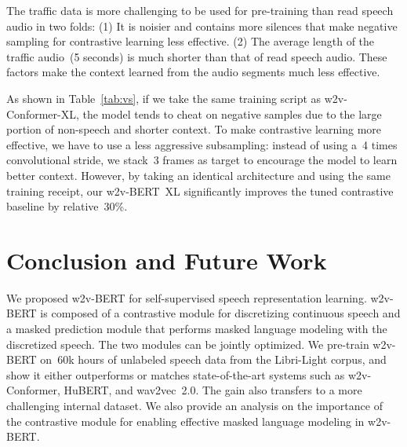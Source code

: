 \documentclass{article}
\begin{document}
The traffic data is more challenging to be used for pre-training than read speech audio in two folds: (1) It is noisier and contains more silences that make negative sampling for contrastive learning less effective.
(2) The average length of the traffic audio~(5 seconds) is much shorter than that of read speech audio.
These factors make the context learned from the audio segments much less effective.

\begin{table}[htbp]
  \caption{Results on voice search data. Baseline conformer model is 100M parameters. All the other models are 600M parameters, marked as XL.}
  \vskip 0.1in
  \label{tab:vs}
  \centering
\end{table}

As shown in Table~\ref{tab:vs}, if we take the same training script as w2v-Conformer-XL, the model tends to cheat on negative samples due to the large portion of non-speech and shorter context.
To make contrastive learning more effective, we have to use a less aggressive subsampling: instead of using a~4 times convolutional stride, we stack~3 frames as target to encourage the model to learn better context.
However, by taking an identical architecture and using the same training receipt, our w2v-BERT~XL significantly improves the tuned contrastive baseline by relative~30\%.


\section{Conclusion and Future Work}
\label{sec:conclusion}
We proposed w2v-BERT for self-supervised speech representation learning.
w2v-BERT is composed of a contrastive module for discretizing continuous speech and a masked prediction module that performs masked language modeling with the discretized speech.
The two modules can be jointly optimized.
We pre-train w2v-BERT on~60k hours of unlabeled speech data from the Libri-Light corpus, and show it either outperforms or matches state-of-the-art systems such as w2v-Conformer, HuBERT, and wav2vec~2.0.
The gain also transfers to a more challenging internal dataset.
We also provide an analysis on the importance of the contrastive module for enabling effective masked language modeling in w2v-BERT.
\end{document}
